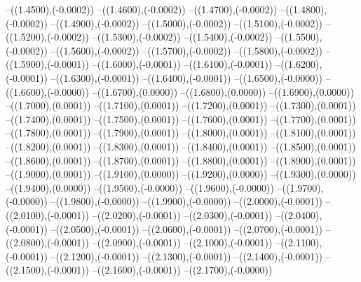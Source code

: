 {	--({\sx*(1.4500)},{\sy*(-0.0002)})
	--({\sx*(1.4600)},{\sy*(-0.0002)})
	--({\sx*(1.4700)},{\sy*(-0.0002)})
	--({\sx*(1.4800)},{\sy*(-0.0002)})
	--({\sx*(1.4900)},{\sy*(-0.0002)})
	--({\sx*(1.5000)},{\sy*(-0.0002)})
	--({\sx*(1.5100)},{\sy*(-0.0002)})
	--({\sx*(1.5200)},{\sy*(-0.0002)})
	--({\sx*(1.5300)},{\sy*(-0.0002)})
	--({\sx*(1.5400)},{\sy*(-0.0002)})
	--({\sx*(1.5500)},{\sy*(-0.0002)})
	--({\sx*(1.5600)},{\sy*(-0.0002)})
	--({\sx*(1.5700)},{\sy*(-0.0002)})
	--({\sx*(1.5800)},{\sy*(-0.0002)})
	--({\sx*(1.5900)},{\sy*(-0.0001)})
	--({\sx*(1.6000)},{\sy*(-0.0001)})
	--({\sx*(1.6100)},{\sy*(-0.0001)})
	--({\sx*(1.6200)},{\sy*(-0.0001)})
	--({\sx*(1.6300)},{\sy*(-0.0001)})
	--({\sx*(1.6400)},{\sy*(-0.0001)})
	--({\sx*(1.6500)},{\sy*(-0.0000)})
	--({\sx*(1.6600)},{\sy*(-0.0000)})
	--({\sx*(1.6700)},{\sy*(0.0000)})
	--({\sx*(1.6800)},{\sy*(0.0000)})
	--({\sx*(1.6900)},{\sy*(0.0000)})
	--({\sx*(1.7000)},{\sy*(0.0001)})
	--({\sx*(1.7100)},{\sy*(0.0001)})
	--({\sx*(1.7200)},{\sy*(0.0001)})
	--({\sx*(1.7300)},{\sy*(0.0001)})
	--({\sx*(1.7400)},{\sy*(0.0001)})
	--({\sx*(1.7500)},{\sy*(0.0001)})
	--({\sx*(1.7600)},{\sy*(0.0001)})
	--({\sx*(1.7700)},{\sy*(0.0001)})
	--({\sx*(1.7800)},{\sy*(0.0001)})
	--({\sx*(1.7900)},{\sy*(0.0001)})
	--({\sx*(1.8000)},{\sy*(0.0001)})
	--({\sx*(1.8100)},{\sy*(0.0001)})
	--({\sx*(1.8200)},{\sy*(0.0001)})
	--({\sx*(1.8300)},{\sy*(0.0001)})
	--({\sx*(1.8400)},{\sy*(0.0001)})
	--({\sx*(1.8500)},{\sy*(0.0001)})
	--({\sx*(1.8600)},{\sy*(0.0001)})
	--({\sx*(1.8700)},{\sy*(0.0001)})
	--({\sx*(1.8800)},{\sy*(0.0001)})
	--({\sx*(1.8900)},{\sy*(0.0001)})
	--({\sx*(1.9000)},{\sy*(0.0001)})
	--({\sx*(1.9100)},{\sy*(0.0000)})
	--({\sx*(1.9200)},{\sy*(0.0000)})
	--({\sx*(1.9300)},{\sy*(0.0000)})
	--({\sx*(1.9400)},{\sy*(0.0000)})
	--({\sx*(1.9500)},{\sy*(-0.0000)})
	--({\sx*(1.9600)},{\sy*(-0.0000)})
	--({\sx*(1.9700)},{\sy*(-0.0000)})
	--({\sx*(1.9800)},{\sy*(-0.0000)})
	--({\sx*(1.9900)},{\sy*(-0.0000)})
	--({\sx*(2.0000)},{\sy*(-0.0001)})
	--({\sx*(2.0100)},{\sy*(-0.0001)})
	--({\sx*(2.0200)},{\sy*(-0.0001)})
	--({\sx*(2.0300)},{\sy*(-0.0001)})
	--({\sx*(2.0400)},{\sy*(-0.0001)})
	--({\sx*(2.0500)},{\sy*(-0.0001)})
	--({\sx*(2.0600)},{\sy*(-0.0001)})
	--({\sx*(2.0700)},{\sy*(-0.0001)})
	--({\sx*(2.0800)},{\sy*(-0.0001)})
	--({\sx*(2.0900)},{\sy*(-0.0001)})
	--({\sx*(2.1000)},{\sy*(-0.0001)})
	--({\sx*(2.1100)},{\sy*(-0.0001)})
	--({\sx*(2.1200)},{\sy*(-0.0001)})
	--({\sx*(2.1300)},{\sy*(-0.0001)})
	--({\sx*(2.1400)},{\sy*(-0.0001)})
	--({\sx*(2.1500)},{\sy*(-0.0001)})
	--({\sx*(2.1600)},{\sy*(-0.0001)})
	--({\sx*(2.1700)},{\sy*(-0.0000)})
}
